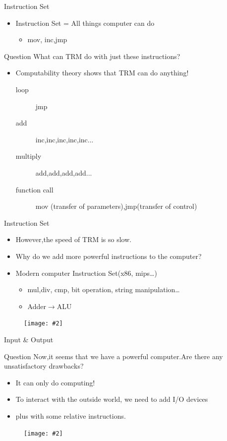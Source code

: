 \documentclass{beamer}
\newcommand{\fignocaption}[2]{
	\begin{figure}[htp]
		\centering
		\texttt{[image: \#2]}
	\end{figure}
}
\begin{document}
\begin{frame}{Instruction Set}
	\begin{itemize}
		\item \alert{Instruction Set = All things computer can do}
		\begin{itemize}
			\item	mov, inc,jmp
		\end{itemize}

\end{itemize}

\begin{block}{Question}
	What can TRM do with just these instructions?
\end{block}
\pause
\begin{itemize}
		\item Computability theory shows that TRM can do anything!
		\begin{description}
			\item [loop]  jmp
			\item [add] inc,inc,inc,inc,inc...
			\item [multiply] add,add,add,add...
			\item [function call] mov (transfer of parameters),jmp(transfer of control)
		\end{description}

	\end{itemize}

\end{frame}

\begin{frame}{Instruction Set}
	\begin{itemize}
		\item However,the speed of TRM is so slow.
		\item Why do we add more powerful instructions to the computer?
		\item \alert{Modern computer Instruction Set}(x86, mips…)
		\begin{itemize}
			\item mul,div, cmp, bit operation, string manipulation…
			\item Adder$\longrightarrow$ALU
		\end{itemize}

	\end{itemize}
	\fignocaption{scale=0.4}{modernisa.png}
\end{frame}

\begin{frame}{Input \& Output}
	\begin{block}{Question}
		Now,it seems that we have a powerful computer.Are there any unsatisfactory drawbacks?
	\end{block}
	\begin{itemize}
		\pause
		\item It can only do computing!
		\item To interact with the outside world, \alert{we need to add I/O devices}
		\item plus with some relative instructions.
	\end{itemize}

	\fignocaption{scale=0.4}{io.png}
\end{frame}
\end{document}
